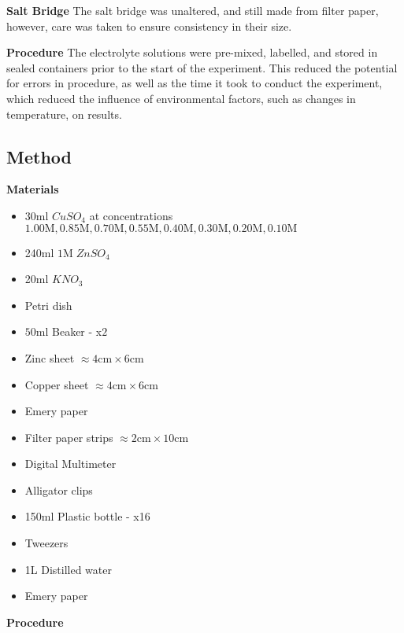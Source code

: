 \documentclass[11pt,a4paper]{article}
\begin{document}
\textbf{Salt Bridge}\newline
The salt bridge was unaltered, and still made from filter paper, however, care was taken to ensure consistency in their size.

\textbf{Procedure}\newline
The electrolyte solutions were pre-mixed, labelled, and stored in sealed containers prior to the start of the experiment. This reduced the potential for errors in procedure, as well as the time it took to conduct the experiment, which reduced the influence of environmental factors, such as changes in temperature, on results.

\subsection{Method}
\textbf{Materials}
\begin{itemize}
	\item 30ml $CuSO_4$ at concentrations $1.00\textrm{M}, 0.85\textrm{M}, 0.70\textrm{M}, 0.55\textrm{M}, 0.40\textrm{M}, 0.30\textrm{M}, 0.20\textrm{M}, 0.10\textrm{M}$
	\item 240ml $1$M$\;ZnSO_4$
	\item 20ml $KNO_3$
	\item Petri dish
	\item $50\textrm{ml}$ Beaker - x$2$
	\item Zinc sheet $\approx4\textrm{cm}\times6\textrm{cm}$ 
	\item Copper sheet $\approx4\textrm{cm}\times6\textrm{cm}$ 
	\item Emery paper
	\item Filter paper strips $\approx 2\textrm{cm}\times10\textrm{cm}$
	\item Digital Multimeter
	\item Alligator clips
	\item 150ml Plastic bottle - x16
	\item Tweezers 
	\item 1L Distilled water
	\item Emery paper
\end{itemize}
\newpage
\textbf{Procedure}
\small
\end{document}
